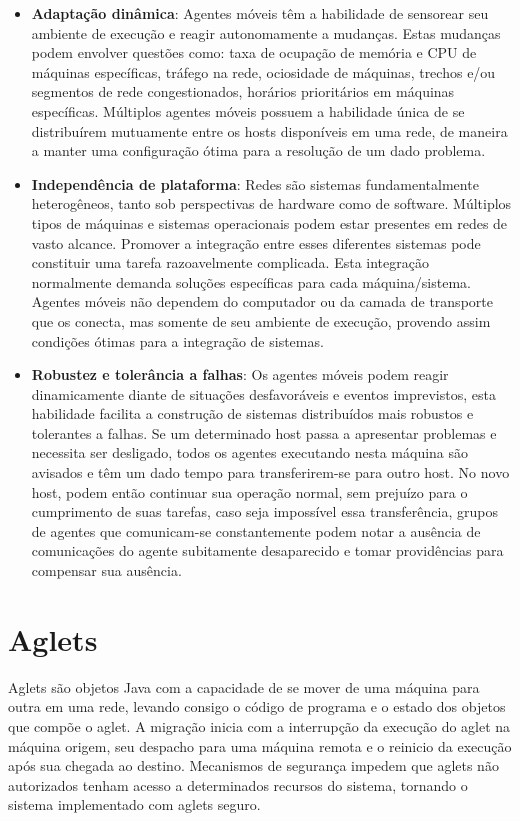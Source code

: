 \begin{itemize}
	\item \textbf{Adaptação dinâmica}: Agentes móveis têm a habilidade de sensorear seu ambiente de execução e reagir autonomamente a mudanças. Estas mudanças podem envolver questões como: taxa de ocupação de memória e CPU de máquinas específicas, tráfego na rede, ociosidade de máquinas, trechos e/ou segmentos de rede congestionados, horários prioritários em máquinas específicas. Múltiplos agentes móveis possuem a habilidade única de se distribuírem mutuamente entre os hosts disponíveis em uma rede, de maneira a manter uma configuração ótima para a resolução de um dado problema.

	\item \textbf{Independência de plataforma}: Redes são sistemas fundamentalmente heterogêneos, tanto sob perspectivas de hardware como de software. Múltiplos tipos de máquinas e sistemas operacionais podem estar presentes em redes de vasto alcance. Promover a integração entre esses diferentes sistemas pode constituir uma tarefa razoavelmente complicada. Esta integração normalmente demanda soluções específicas para cada máquina/sistema. Agentes móveis não dependem do computador ou da camada de transporte que os conecta, mas somente de seu ambiente de execução, provendo assim condições ótimas para a integração de sistemas.

	\item \textbf{Robustez e tolerância a falhas}: Os agentes móveis podem reagir dinamicamente diante de situações desfavoráveis e eventos imprevistos, esta habilidade facilita a construção de sistemas distribuídos mais robustos e tolerantes a falhas. Se um determinado host passa a apresentar problemas e necessita ser desligado, todos os agentes executando nesta máquina são avisados e têm um dado tempo para transferirem-se para outro host. No novo host, podem então continuar sua operação normal, sem prejuízo para o cumprimento de suas tarefas, caso seja impossível essa transferência, grupos de agentes que comunicam-se constantemente podem notar a ausência de comunicações do agente subitamente desaparecido e tomar providências para compensar sua ausência.
\end{itemize}

\section{Aglets}
Aglets são objetos Java com a capacidade de se mover de uma máquina para outra em uma rede, levando consigo o código de programa e o estado dos objetos que compõe o aglet. A migração inicia com a interrupção da execução do aglet na máquina origem, seu despacho para uma máquina remota e o reinicio da execução após sua chegada ao destino. Mecanismos de segurança impedem que aglets não autorizados tenham acesso a determinados recursos do sistema, tornando o sistema implementado com aglets seguro. 

